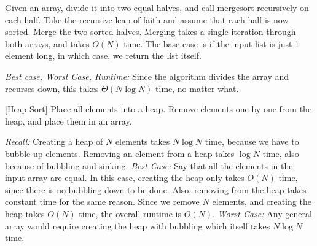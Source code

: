 \begin{solution}
Given an array, divide it into two equal halves, and call mergesort recursively
on each half. Take the recursive leap of faith and assume that each half is now
sorted. Merge the two sorted halves. Merging takes a single iteration through
both arrays, and takes $O(N)$ time. The base case is if the input list is just
1 element long, in which case, we return the list itself.


\textit{Best case, Worst Case, Runtime:} Since the algorithm divides the
array and recurses down, this takes $\Theta(N \log N)$ time, no matter what.

[Heap Sort]
Place all elements into a heap. Remove elements one by one from the heap, and
place them in an array.


\textit{Recall:} Creating a heap of $N$ elements takes $N \log N$ time,
because we have to bubble-up elements. Removing an element from a heap takes
$\log N$ time, also because of bubbling and sinking.
\textit{Best Case:} Say that all the elements in the input array are
equal. In this case, creating the heap only takes $O(N)$ time, since there is
no bubbling-down to be done. Also, removing from the heap takes constant time
for the same reason. Since we remove $N$ elements, and creating the heap takes
$O(N)$ time, the overall runtime is $O(N)$.
\textit{Worst Case:} Any general array would require creating the heap
with bubbling which itself takes $N \log N$ time.
\end{solution}
